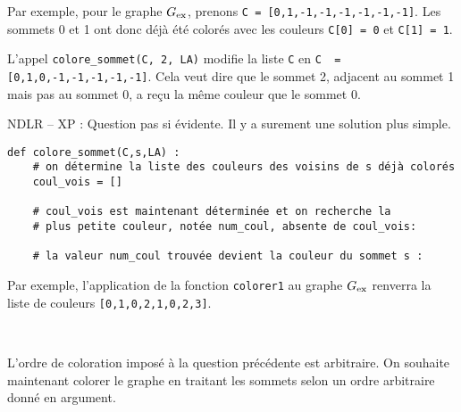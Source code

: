 \ifprof
\else
Par exemple, pour le graphe ${G}_{\text{ex}}$, prenons \lstinline{C = [0,1,-1,-1,-1,-1,-1,-1]}. Les sommets 0 et 1 ont donc déjà été colorés avec les couleurs \lstinline{C[0] = 0} et \lstinline{C[1] = 1}.

L'appel \lstinline{colore_sommet(C, 2, LA)} modifie la liste \lstinline{C} en \lstinline{C  = [0,1,0,-1,-1,-1,-1,-1]}. Cela veut dire que le sommet 2, adjacent au sommet 1 mais pas au sommet 0, a reçu la même couleur que le sommet 0.
\fi

\ifprof
\begin{corrige}
NDLR -- XP : Question pas si évidente. Il y a surement une solution plus simple.



\end{corrige}

\else
\begin{lstlisting}
def colore_sommet(C,s,LA) :
    # on détermine la liste des couleurs des voisins de s déjà colorés
    coul_vois = []
    
    # coul_vois est maintenant déterminée et on recherche la
    # plus petite couleur, notée num_coul, absente de coul_vois:
    
    # la valeur num_coul trouvée devient la couleur du sommet s :
\end{lstlisting}
\fi


Par exemple, l'application de la fonction \lstinline{colorer1} au graphe ${G}_{\text{ex}}$ renverra la liste de couleurs \lstinline{[0,1,0,2,1,0,2,3]}.
\ifprof
\begin{corrige}~\\ \vspace{-.5cm}

\end{corrige}
\else
\fi

\ifprof\else
L'ordre de coloration imposé à la question précédente est arbitraire. On souhaite maintenant colorer le graphe en traitant les sommets selon un ordre arbitraire donné en argument.
\fi


